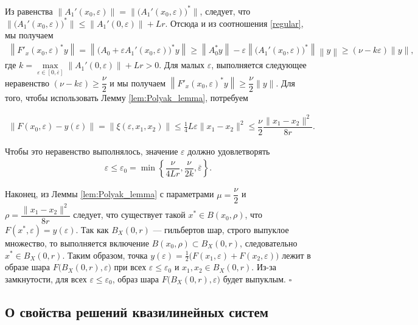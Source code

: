 \documentclass[../main.tex]{subfiles}
\begin{document}
Из равенства $\|A_1'(x_0,\varepsilon)\| = \|\big(A_1'(x_0,\varepsilon)\big)^*\| $, следует, что  $\|\big(A_1'(x_0,\varepsilon)\big)^*\| \leqslant \| A_1'(0,\varepsilon)\| + Lr$.
Отсюда и из соотношения \eqref{regular}, мы получаем 
\begin{gather*}
    \left\|F'_x(x_0, \varepsilon)^* y\right\| = \left\|\big(A_0 + \varepsilon A_1'(x_0, \varepsilon)\big)^* y\right\| \geqslant \left\|A_0^*y \right\| - \varepsilon \left\|\big(A_1'(x_0,\varepsilon)\big)^*\right\| \left\|y\right\| \geqslant (\nu - k\varepsilon)\|y\|,
\end{gather*} где $k = \max\limits_{\varepsilon \in [0,\overline{\varepsilon}]}\| A_1'(0,\varepsilon)\| + Lr > 0$.
Для малых $\varepsilon$, выполняется следующее неравенство $(\nu - k\varepsilon) \geqslant \dfrac{\nu}{2}$ и мы получаем $\left\|F'_x(x_0, \varepsilon)^* y\right\| \geqslant \dfrac{\nu}{2} \|y\|$. Для того, чтобы использовать Лемму  \ref{lem:Polyak_lemma}, потребуем

\begin{gather*}
    \| F(x_0,\varepsilon) - y(\varepsilon) \| = \|\xi(\varepsilon,x_1,x_2)\| \leqslant \frac{1}{4}L\varepsilon\|x_1-x_2\|^2 \leqslant \dfrac{\nu}{2} \dfrac{\|x_1-x_2\|^2}{8r}.
\end{gather*}

Чтобы это неравенство выполнялось, значение  $\varepsilon$ должно удовлетворять 
\begin{gather}
    \varepsilon \leqslant \varepsilon_0 = \min\left\{\dfrac{\nu}{4Lr}, \dfrac{\nu}{2k}, \overline{\varepsilon}\right\}.
\end{gather} 

Наконец, из Леммы \ref{lem:Polyak_lemma} с параметрами $\mu=\dfrac{\nu}{2}$ и $\rho=\dfrac{\|x_1-x_2\|^2}{8r}$ следует, что существует такой $x^*\in B(x_0, \rho)$, что $F(x^*,\varepsilon) = y(\varepsilon)$.
Так как $B_X(0, r)$ --- гильбертов шар, строго выпуклое множество, то выполняется включение $B(x_0, \rho) \subset B_X(0, r)$, следовательно $x^* \in B_X(0, r)$. Таким образом, точка $y(\varepsilon) = \frac{1}{2} \big( F(x_1,\varepsilon) + F(x_2,\varepsilon)\big)$ лежит в образе шара $F\big(B_X(0,r),\varepsilon\big) $  при  всех  $\varepsilon \leqslant \varepsilon_0$ и $x_1, x_2 \in B_X(0,r)$. Из-за замкнутости, для всех $\varepsilon \leqslant \varepsilon_0$, образ шара $F\big(B_X(0,r),\varepsilon\big) $ будет выпуклым.
\hfill$\square$\\[1ex]%

\subsection{О свойства решений квазилинейных систем}
\end{document}
